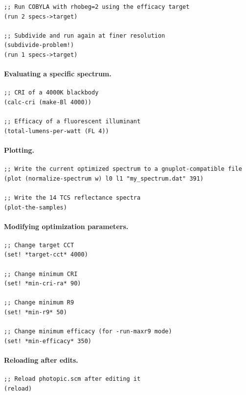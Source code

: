 \documentclass[11pt]{article}
\begin{document}
\begin{lstlisting}[style=scheme]
;; Run COBYLA with rhobeg=2 using the efficacy target
(run 2 specs->target)

;; Subdivide and run again at finer resolution
(subdivide-problem!)
(run 1 specs->target)
\end{lstlisting}

\paragraph{Evaluating a specific spectrum.}

\begin{lstlisting}[style=scheme]
;; CRI of a 4000K blackbody
(calc-cri (make-Bl 4000))

;; Efficacy of a fluorescent illuminant
(total-lumens-per-watt (FL 4))
\end{lstlisting}

\paragraph{Plotting.}

\begin{lstlisting}[style=scheme]
;; Write the current optimized spectrum to a gnuplot-compatible file
(plot (normalize-spectrum w) l0 l1 "my_spectrum.dat" 391)

;; Write the 14 TCS reflectance spectra
(plot-the-samples)
\end{lstlisting}

\paragraph{Modifying optimization parameters.}

\begin{lstlisting}[style=scheme]
;; Change target CCT
(set! *target-cct* 4000)

;; Change minimum CRI
(set! *min-cri-ra* 90)

;; Change minimum R9
(set! *min-r9* 50)

;; Change minimum efficacy (for -run-maxr9 mode)
(set! *min-efficacy* 350)
\end{lstlisting}

\paragraph{Reloading after edits.}

\begin{lstlisting}[style=scheme]
;; Reload photopic.scm after editing it
(reload)
\end{lstlisting}
\end{document}
